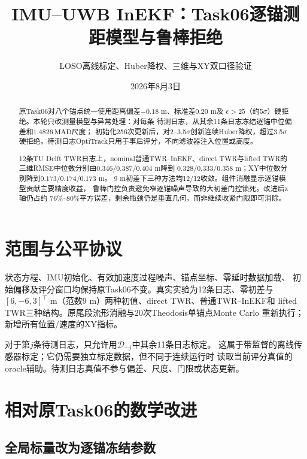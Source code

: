 \documentclass[11pt,a4paper]{ctexart}
\title{IMU--UWB InEKF：Task06逐锚测距模型与鲁棒拒绝}
\author{LOSO离线标定、Huber降权、三维与XY双口径验证}
\date{2026年8月3日}
\begin{document}
\pagestyle{plain}
\maketitle

\begin{abstract}
原Task06对八个锚点统一使用距离偏差$-0.18$ m、标准差$0.20$ m及
$\epsilon>25$（约5$\sigma$）硬拒绝。本轮只改测量模型与异常处理：对每条
待测日志，从其余11条日志冻结逐锚中位偏差和$1.4826\,\mathrm{MAD}$尺度；
初始化256次更新后，对2--3.5$\sigma$创新连续Huber降权，超过3.5$\sigma$
硬拒绝。待测日志OptiTrack只用于事后评分，不向滤波器注入位置或高度。

12条TU Delft TWR日志上，nominal普通TWR--InEKF、direct TWR与lifted
TWR的三维RMSE中位数分别由$0.346/0.387/0.404$ m降到
$0.328/0.333/0.358$ m；XY中位数分别降到$0.173/0.174/0.173$ m。
9 m初差下三种方法均12/12收敛。组件消融显示逐锚模型贡献主要精度收益，
鲁棒门控负责避免窄逐锚噪声导致的大初差门控锁死。改进后z轴仍占约
$76\%$--$80\%$平方误差，剩余瓶颈仍是垂直几何，而非继续收紧门限即可消除。
\end{abstract}

\section{范围与公平协议}

状态方程、IMU初始化、有效加速度过程噪声、锚点坐标、零延时数据加载、
初始偏移及评分窗口均保持原Task06不变。真实实验为12条日志、零初差与
$[6,-6,3]^\top$ m（范数9 m）两种初值、direct TWR、普通TWR--InEKF和
lifted TWR三种结构。原尾段流形消融与20次Theodosis单锚点Monte Carlo
重新执行；新增所有位置/速度的XY指标。

对于第$j$条待测日志，只允许用$\mathcal D_{-j}$中其余11条日志标定。
这属于带监督的离线传感器标定；它仍需要独立标定数据，但不同于连续运行时
读取当前评分真值的oracle辅助。待测日志真值不参与偏差、尺度、门限或状态更新。

\section{相对原Task06的数学改进}

\subsection{全局标量改为逐锚冻结参数}
\end{document}
